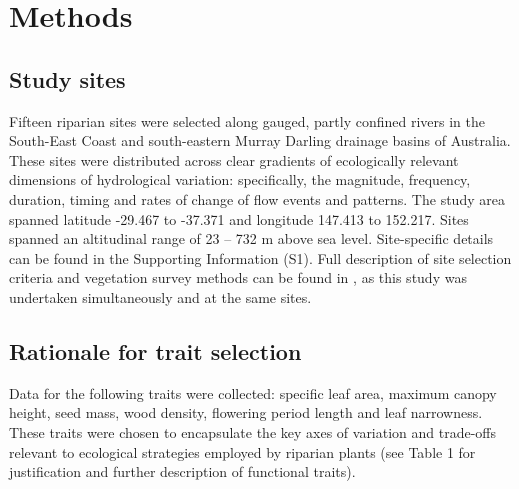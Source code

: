 \documentclass[openright,12pt,a4paper]{memoir}
\begin{document}
\section{Methods}
\subsection{Study sites}
Fifteen riparian sites were selected along gauged, partly confined rivers in the South-East Coast and south-eastern Murray Darling drainage basins of Australia. These sites were distributed across clear gradients of ecologically relevant dimensions of hydrological variation: specifically, the magnitude, frequency, duration, timing and rates of change of flow events and patterns. The study area spanned latitude -29.467 to -37.371 and longitude 147.413 to 152.217. Sites spanned an altitudinal range of 23 – 732 m above sea level. Site-specific details can be found in the Supporting Information (S1).  Full description of site selection criteria and vegetation survey methods can be found in \cite{Lawson2015}, as this study was undertaken simultaneously and at the same sites.

\subsection{Rationale for trait selection}
Data for the following traits were collected: specific leaf area, maximum canopy height, seed mass, wood density, flowering period length and leaf narrowness. These traits were chosen to encapsulate the key axes of variation and trade-offs relevant to ecological strategies employed by riparian plants (see Table 1 for justification and further description of functional traits).
\end{document}
